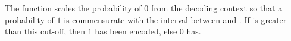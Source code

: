 \begin{informative}
The function scales the probability of $0$ from the decoding context
so that a probability of $1$ is commensurate with the interval between
 \ALow and \AHigh. If \ACode is greater than this cut-off, then $1$ has
been encoded, else $0$ has.

\end{informative}
